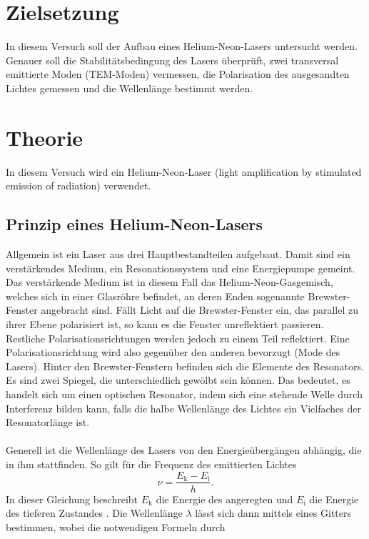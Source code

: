 \section{Zielsetzung}
In diesem Versuch soll der
Aufbau eines Helium-Neon-Lasers untersucht werden.
Genauer soll die Stabilitätsbedingung des Lasers überprüft, zwei 
transversal emittierte Moden (TEM-Moden) vermessen, die Polarisation des 
ausgesandten Lichtes gemessen und die Wellenlänge bestimmt werden.

\section{Theorie}
\label{sec:Theorie}

In diesem Versuch wird ein Helium-Neon-Laser (light amplification by stimulated emission 
of radiation) verwendet.

\subsection{Prinzip eines Helium-Neon-Lasers}

Allgemein ist ein Laser aus drei Hauptbestandteilen aufgebaut. Damit sind ein 
verstärkendes Medium, ein Resonationssystem und eine Energiepumpe gemeint.
Das verstärkende Medium ist in diesem Fall das Helium-Neon-Gasgemisch, welches sich 
in einer Glasröhre befindet, an deren Enden sogenannte Brewster-Fenster angebracht sind.
Fällt Licht auf die Brewster-Fenster ein, das parallel zu ihrer Ebene polarisiert ist,
so kann es die Fenster unreflektiert passieren. Restliche Polarisationsrichtungen werden jedoch
zu einem Teil reflektiert. Eine Polarisationsrichtung wird also gegenüber den anderen 
bevorzugt (Mode des Lasers). Hinter den Brewster-Fenstern befinden sich die 
Elemente des Resonators. Es sind zwei Spiegel, die unterschiedlich gewölbt sein können.
Das bedeutet, es handelt sich um einen optischen Resonator, indem sich eine 
stehende Welle durch Interferenz bilden kann, falls die halbe Wellenlänge des Lichtes ein 
Vielfaches der Resonatorlänge ist.\\\\
Generell ist die Wellenlänge des Lasers von den Energieübergängen abhängig, die in ihm 
stattfinden. So gilt für die Frequenz des emittierten Lichtes 
\begin{equation}
    \nu = \frac{ E_{\text{k}} - E_{\text{i}} }{h}.
    \label{eq1}
\end{equation}
In dieser Gleichung beschreibt $E_{\text{k}}$ die Energie des angeregten 
und $E_{\text{i}}$ die Energie des tieferen Zustandes \cite{1}.
Die Wellenlänge $\lambda$ lässt sich dann mittels eines Gitters bestimmen, wobei die 
notwendigen Formeln durch

